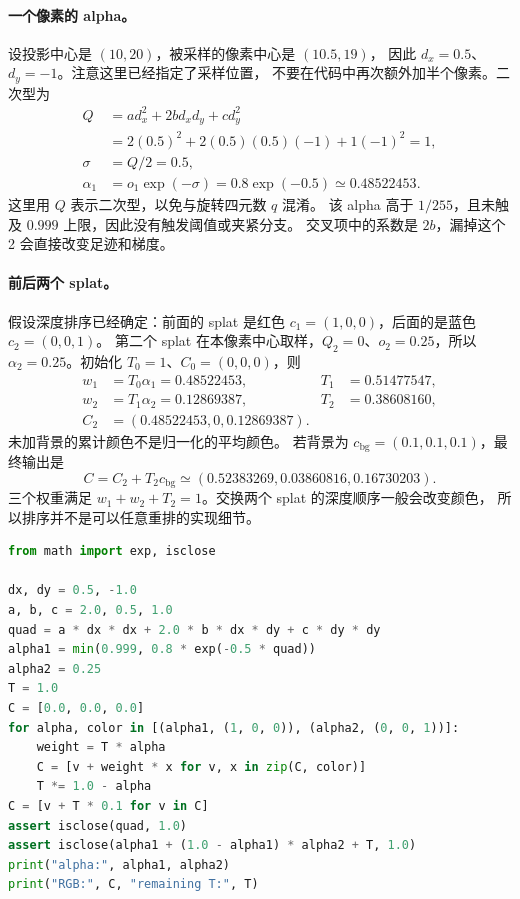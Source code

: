 \paragraph{一个像素的 alpha。}
设投影中心是 \((10,20)\)，被采样的像素中心是 \((10.5,19)\)，
因此 \(d_x=0.5\)、\(d_y=-1\)。注意这里已经指定了采样位置，
不要在代码中再次额外加半个像素。二次型为
\begin{align*}
 Q&=a d_x^2+2b d_xd_y+c d_y^2\\
  &=2(0.5)^2+2(0.5)(0.5)(-1)+1(-1)^2=1,\\
 \sigma&=Q/2=0.5,\\
 \alpha_1&=o_1\exp(-\sigma)=0.8\exp(-0.5)
          \simeq0.48522453.
\end{align*}
这里用 \(Q\) 表示二次型，以免与旋转四元数 \(q\) 混淆。
该 alpha 高于 \(1/255\)，且未触及 \(0.999\) 上限，因此没有触发阈值或夹紧分支。
交叉项中的系数是 \(2b\)，漏掉这个 2 会直接改变足迹和梯度。

\paragraph{前后两个 splat。}
假设深度排序已经确定：前面的 splat 是红色
\(c_1=(1,0,0)\)，后面的是蓝色 \(c_2=(0,0,1)\)。
第二个 splat 在本像素中心取样，\(Q_2=0\)、\(o_2=0.25\)，所以
\(\alpha_2=0.25\)。初始化 \(T_0=1\)、\(C_0=(0,0,0)\)，则
\begin{align*}
 w_1&=T_0\alpha_1=0.48522453,& T_1&=0.51477547,\\
 w_2&=T_1\alpha_2=0.12869387,& T_2&=0.38608160,\\
 C_2&=(0.48522453,0,0.12869387).
\end{align*}
未加背景的累计颜色不是归一化的平均颜色。
若背景为 \(c_{\mathrm{bg}}=(0.1,0.1,0.1)\)，最终输出是
\[
 C=C_2+T_2c_{\mathrm{bg}}
 \simeq(0.52383269,0.03860816,0.16730203).
\]
三个权重满足 \(w_1+w_2+T_2=1\)。交换两个 splat 的深度顺序一般会改变颜色，
所以排序并不是可以任意重排的实现细节。

\begin{lstlisting}[language=Python]
from math import exp, isclose

dx, dy = 0.5, -1.0
a, b, c = 2.0, 0.5, 1.0
quad = a * dx * dx + 2.0 * b * dx * dy + c * dy * dy
alpha1 = min(0.999, 0.8 * exp(-0.5 * quad))
alpha2 = 0.25
T = 1.0
C = [0.0, 0.0, 0.0]
for alpha, color in [(alpha1, (1, 0, 0)), (alpha2, (0, 0, 1))]:
    weight = T * alpha
    C = [v + weight * x for v, x in zip(C, color)]
    T *= 1.0 - alpha
C = [v + T * 0.1 for v in C]
assert isclose(quad, 1.0)
assert isclose(alpha1 + (1.0 - alpha1) * alpha2 + T, 1.0)
print("alpha:", alpha1, alpha2)
print("RGB:", C, "remaining T:", T)
\end{lstlisting}

